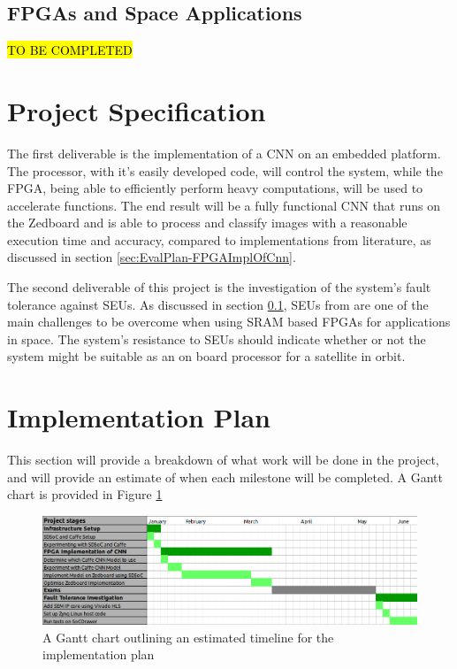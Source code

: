 \documentclass[12pt]{article}
\begin{document}
\subsection{FPGAs and Space Applications}
\label{sec:Background-FPGAsAndSpaceApplications}
\vspace{-12pt}

\hl{TO BE COMPLETED}

\section{Project Specification}
\label{sec:ProjSpec}
\vspace{-12pt}

The first deliverable is the implementation of a CNN on an embedded platform.  The processor, with it's easily developed code, will control the system, while the FPGA, being able to efficiently perform heavy computations, will be used to accelerate functions. The end result will be a fully functional CNN that runs on the Zedboard and is able to process and classify images with a reasonable execution time and accuracy, compared to implementations from literature, as discussed in section \ref{sec:EvalPlan-FPGAImplOfCnn}.

The second deliverable of this project is the investigation of the system's fault tolerance against SEUs. As discussed in section \ref{sec:Background-FPGAsAndSpaceApplications}, SEUs from are one of the main challenges to be overcome when using SRAM based FPGAs for applications in space. The system's resistance to SEUs should indicate whether or not the system might be suitable as an on board processor for a satellite in orbit.

\section{Implementation Plan}
\label{sec:ImpPlan}
\vspace{-12pt}

This section will provide a breakdown of what work will be done in the project, and will provide an estimate of when each milestone will be completed. A Gantt chart is provided in Figure \ref{fig:gantt}
\begin{figure}

\centering
\includegraphics[width=1\textwidth]{../figures/gantt}

  \caption{A Gantt chart outlining an estimated timeline for the implementation plan \label{fig:gantt}}

\end{figure}
\end{document}
